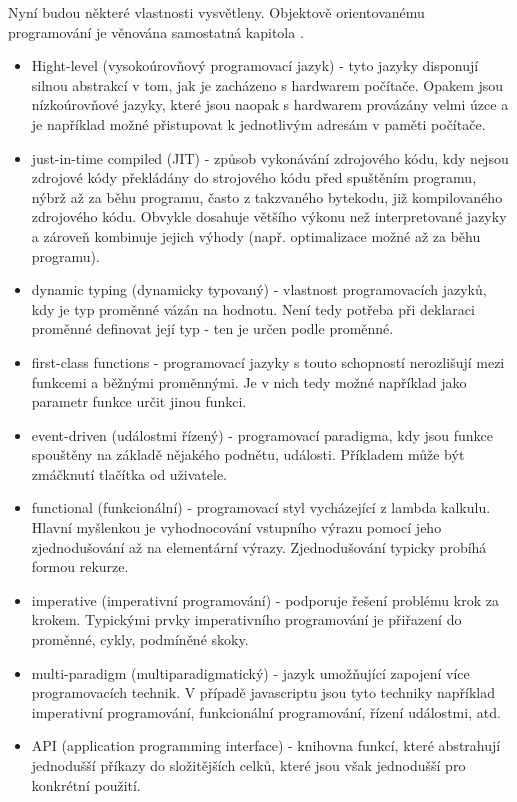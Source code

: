 \documentclass[main.tex]{subfiles}
\begin{document}
Nyní budou některé vlastnosti vysvětleny. Objektově orientovanému programování je věnována samostatná kapitola .
\begin{itemize}
    \item Hight-level (vysokoúrovňový programovací jazyk) - tyto jazyky disponují silnou abstrakcí v tom, jak je zacházeno s hardwarem počítače. Opakem jsou nízkoúrovňové jazyky, které jsou naopak s hardwarem provázány velmi úzce a je například možné přistupovat k jednotlivým adresám v paměti počítače.
    \item just-in-time compiled (JIT) - způsob vykonávání zdrojového kódu, kdy nejsou zdrojové kódy překládány do strojového kódu před spuštěním programu, nýbrž až za běhu programu, často z takzvaného bytekodu, již kompilovaného zdrojového kódu. Obvykle dosahuje většího výkonu než interpretované jazyky a zároveň kombinuje jejich výhody (např. optimalizace možné až za běhu programu).
    \item dynamic typing (dynamicky typovaný) - vlastnost programovacích jazyků, kdy je typ proměnné vázán na hodnotu. Není tedy potřeba při deklaraci proměnné definovat její typ - ten je určen podle proměnné.
    \item first-class functions - programovací jazyky s touto schopností nerozlišují mezi funkcemi a běžnými proměnnými. Je v nich tedy možné například jako parametr funkce určit jinou funkci.

    \item event-driven (událostmi řízený) - programovací paradigma, kdy jsou funkce spouštěny na základě nějakého podnětu, události. Příkladem může být zmáčknutí tlačítka od uživatele. 
    \item functional (funkcionální) - programovací styl vycházející z lambda kalkulu. Hlavní myšlenkou je vyhodnocování vstupního výrazu pomocí jeho zjednodušování až na elementární výrazy. Zjednodušování typicky probíhá formou rekurze. 
    \item imperative (imperativní programování) - podporuje řešení problému krok za krokem. Typickými prvky imperativního programování je přiřazení do proměnné, cykly, podmíněné skoky.  

    \item multi-paradigm (multiparadigmatický) - jazyk umožňující zapojení více programovacích technik. V případě javascriptu jsou tyto techniky například imperativní programování, funkcionální programování, řízení událostmi, atd. 

    \item API (application programming interface) - knihovna funkcí, které abstrahují jednodušší příkazy do složitějších celků, které jsou však jednodušší pro konkrétní použití. 
	\cite{web:wik:cz:js, web:wik:en:js} 
\end{itemize}
\end{document}
